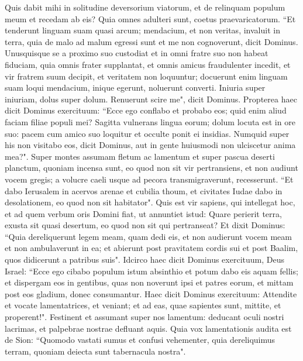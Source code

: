 \begin{biblechapter}  
\verse Quis dabit mihi in solitudine deversorium viatorum, et de relinquam populum meum et recedam ab eis? Quia omnes adulteri sunt, coetus praevaricatorum. 
\verse “Et tenderunt linguam suam quasi arcum; mendacium, et non veritas, invaluit in terra, quia de malo ad malum egressi sunt et me non cognoverunt, dicit Dominus. 
\verse Unusquisque se a proximo suo custodiat et in omni fratre suo non habeat fiduciam, quia omnis frater supplantat, et omnis amicus fraudulenter incedit, 
\verse et vir fratrem suum decipit, et veritatem non loquuntur; docuerunt enim linguam suam loqui mendacium, inique egerunt, noluerunt converti. 
\verse Iniuria super iniuriam, dolus super dolum. Renuerunt scire me", dicit Dominus. 
\verse Propterea haec dicit Dominus exercituum: “Ecce ego conflabo et probabo eos; quid enim aliud faciam filiae populi mei? 
\verse Sagitta vulnerans lingua eorum; dolum locuta est in ore suo: pacem cum amico suo loquitur et occulte ponit ei insidias. 
\verse Numquid super his non visitabo eos, dicit Dominus, aut in gente huiusmodi non ulciscetur anima mea?". 
\verse Super montes assumam fletum ac lamentum et super pascua deserti planctum, quoniam incensa sunt, eo quod non sit vir pertransiens, et non audiunt vocem gregis; a volucre caeli usque ad pecora transmigraverunt, recesserunt. 
\verse “Et dabo Ierusalem in acervos arenae et cubilia thoum, et civitates Iudae dabo in desolationem, eo quod non sit habitator". 
\verse Quis est vir sapiens, qui intellegat hoc, et ad quem verbum oris Domini fiat, ut annuntiet istud: Quare perierit terra, exusta sit quasi desertum, eo quod non sit qui pertranseat? 
\verse Et dixit Dominus: “Quia dereliquerunt legem meam, quam dedi eis, et non audierunt vocem meam et non ambulaverunt in ea; 
\verse et abierunt post pravitatem cordis sui et post Baalim, quos didicerunt a patribus suis". 
\verse Idcirco haec dicit Dominus exercituum, Deus Israel: “Ecce ego cibabo populum istum absinthio et potum dabo eis aquam fellis; 
\verse et dispergam eos in gentibus, quas non noverunt ipsi et patres eorum, et mittam post eos gladium, donec consumantur. 
\verse Haec dicit Dominus exercituum: Attendite et vocate lamentatrices, et veniant; et ad eas, quae sapientes sunt, mittite, et properent!". 
\verse Festinent et assumant super nos lamentum: deducant oculi nostri lacrimas, et palpebrae nostrae defluant aquis. 
\verse Quia vox lamentationis audita est de Sion: “Quomodo vastati sumus et confusi vehementer, quia dereliquimus terram, quoniam deiecta sunt tabernacula nostra". 

\end{biblechapter}
